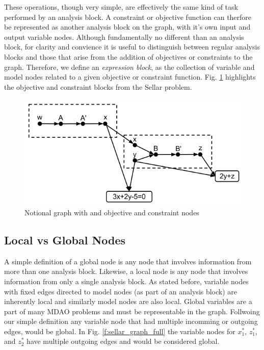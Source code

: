 These operations, though very simple, are effectively the same kind of task 
performed by an analysis block. A constraint or objective function can therfore 
be represented as another analysis block on the graph, with it's own input and 
output variable nodes. Although fundamentally no different than an analysis block, 
for clarity and convience it is useful to distinguish between regular analysis 
blocks and those that arise from the addition of objectives or constraints to 
the graph. Therefore, we define an \emph{expression block}, as the collection of variable and model 
nodes related to a given objective or constraint function. Fig. \ref{f:obj-cons}
highlights the objective and constraint blocks from the Sellar problem. 



\begin{figure}[htb!]
  \begin{center}
    \includegraphics[width=.6\textwidth]{images/obj_const_graph}
  \end{center}
  \caption{Notional graph with and objective and constraint nodes \label{f:obj-cons}}
\end{figure}


\subsection{Local vs Global Nodes}

  A simple definition of a global node is any node that involves information 
  from more than one analysis block. Likewise, a local node is any node 
  that involves information from only a single analysis block. As stated before, variable 
  nodes with fixed edges directed to model nodes (as part of an analysis block) are inherently local 
  and similarly model nodes are also local. Global variables are a part of many 
  MDAO problems and must be representable in the graph. Follwoing our simple definition
  any variable node that had multiple incomming or outgoing edges, would be global. 
  In Fig. \ref{f:sellar_graph_full} the variable nodes for $x_1^*$, $z_1^*$, and $z_2^*$ 
  have multiple outgoing edges and would be considered global. 

